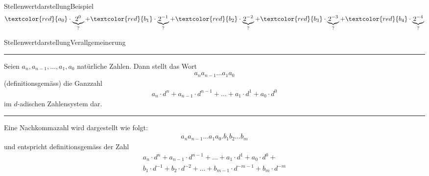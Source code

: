 \begin{frame}{Stellenwertdarstellung}{Beispiel}
{\begin{align*}
        \textcolor{red}{a_0}\cdot\underbrace{2^0}_{?} + 
        \textcolor{red}{b_1}\cdot\underbrace{2^{-1}}_{?} +
        \textcolor{red}{b_2}\cdot\underbrace{2^{-2}}_{?} +
        \textcolor{red}{b_3}\cdot\underbrace{2^{-3}}_{?} +
        \textcolor{red}{b_4}\cdot\underbrace{2^{-4}}_{?}
    \end{align*}
    }
    
\end{frame}

\begin{frame}{Stellenwertdarstellung}{Verallgemeinerung}
    \rule{\textwidth}{0.4pt}
    Seien $a_n,a_{n-1},\ldots,a_1,a_0$ natürliche Zahlen. Dann stellt das Wort
    \begin{align*}
        a_na_{n-1}\ldots a_1a_0
    \end{align*}
    (definitionsgemäss) die Ganzzahl
    \begin{align*}
        a_n\cdot d^n + a_{n-1}\cdot d^{n-1}+\ldots + a_1\cdot d^1 + a_0\cdot d^0
    \end{align*}
    im $d$-adischen Zahlensystem dar. 
    \rule{\textwidth}{0.4pt}
    Eine Nachkommazahl wird dargestellt wie folgt:
    \begin{align*}
        a_na_{n-1}\ldots a_1a_0.b_1b_2\ldots b_m
    \end{align*}
    und entspricht definitionsgemäss der Zahl
    \begin{align*}
        a_n\cdot d^n + a_{n-1}\cdot d^{n-1}+\ldots + a_1\cdot d^1 + a_0\cdot d^0 + \\
        b_1\cdot d^{-1} + b_2\cdot d^{-2} + \ldots + b_{m-1}\cdot d^{-m-1} + b_m\cdot d^{-m} 
    \end{align*}
\end{frame}

